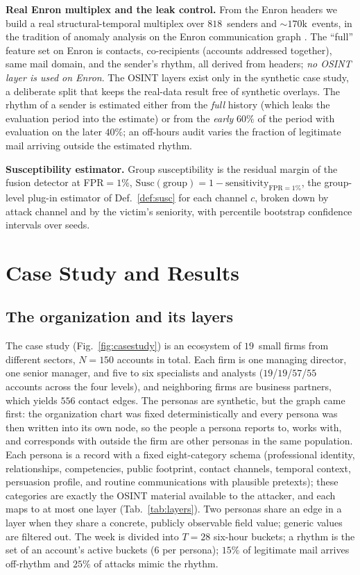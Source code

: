 \documentclass[conference]{IEEEtran}
\begin{document}
\textbf{Real Enron multiplex and the leak control.} From the Enron headers we build a real
structural-temporal multiplex over $818$~senders and $\sim\!170$k~events, in the tradition of anomaly
analysis on the Enron communication graph \cite{priebe2005scan}. The ``full'' feature set on Enron
is contacts, co-recipients (accounts addressed together), same mail domain, and the sender's rhythm, all
derived from headers; \emph{no OSINT layer is used on Enron}. The OSINT layers exist only in the synthetic
case study, a deliberate split that keeps the real-data result free of synthetic overlays. The rhythm of a sender is estimated either
from the \emph{full} history (which leaks the evaluation period into the estimate) or from the \emph{early}
$60\%$ of the period with evaluation on the later $40\%$; an off-hours audit varies the fraction of legitimate
mail arriving outside the estimated rhythm.

\textbf{Susceptibility estimator.} Group susceptibility is the residual margin of the fusion detector at
FPR$=1\%$, $\mathrm{Susc}(\text{group}) = 1 - \text{sensitivity}_{\text{FPR}=1\%}$, the group-level plug-in
estimator of Def.~\ref{def:susc} for each channel $c$, broken down by attack channel and by the victim's seniority, with
percentile bootstrap confidence intervals over seeds.

\section{Case Study and Results}
\label{sec:results}

\subsection{The organization and its layers}
The case study (Fig.~\ref{fig:casestudy}) is an ecosystem of $19$~small firms from different sectors,
$N{=}150$ accounts in total. Each firm is one managing director, one senior manager, and five to six
specialists and analysts ($19$/$19$/$57$/$55$ accounts across the four levels), and neighboring firms are
business partners, which yields $556$ contact edges. The personas are synthetic, but the graph came first:
the organization chart was fixed deterministically and every persona was then written into its own node, so
the people a persona reports to, works with, and corresponds with outside the firm are other personas in the
same population. Each persona is a record with a fixed eight-category schema (professional identity,
relationships, competencies, public footprint, contact channels, temporal context, persuasion profile, and
routine communications with plausible pretexts); these categories are exactly the OSINT material available
to the attacker, and each maps to at most one layer (Tab.~\ref{tab:layers}). Two personas share an edge in a
layer when they share a concrete, publicly observable field value; generic values are filtered out. The week
is divided into $T{=}28$ six-hour buckets; a rhythm is the set of an account's active buckets ($6$ per
persona); $15\%$ of legitimate mail arrives off-rhythm and $25\%$ of attacks mimic the rhythm.
\end{document}
